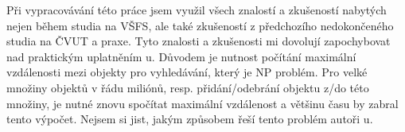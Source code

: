 Při vypracovávání této práce jsem využil všech znalostí a zkušeností nabytých nejen během studia na VŠFS, ale také zkušeností z předchozího nedokončeného studia na ČVUT a praxe. Tyto znalosti a zkušenosti mi dovolují zapochybovat nad praktickým uplatněním \MIndex u.
Důvodem je nutnost počítání maximální vzdálenosti mezi objekty pro vyhledávání, který je NP problém.
Pro velké množiny objektů v řádu miliónů, resp. přidání/odebrání objektu z/do této množiny, je nutné znovu spočítat maximální vzdálenost a většinu času by zabral tento výpočet.
Nejsem si jist, jakým způsobem řeší tento problém autoři \MIndex u.